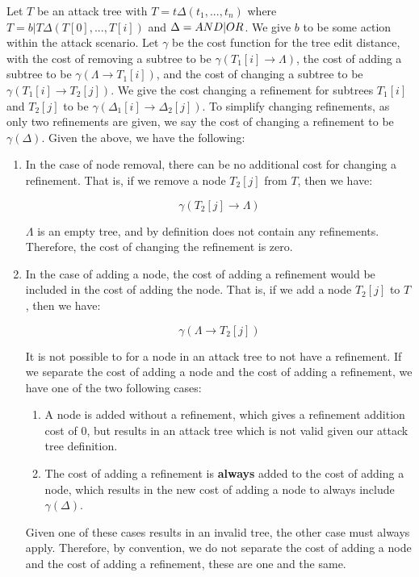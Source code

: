 \begin{definition} \label{def:attack-tree} Let $T$ be an attack tree with $T = t\Delta(t_1,...,t_n)$ where $T = b|T\Delta(T[0],...,T[i])$ and $\Delta = AND|OR$. We give $b$ to be some action within the attack scenario. Let $\gamma$ be the cost function for the tree edit distance, with the cost of removing a subtree to be $\gamma(T_1[i] \rightarrow {\Lambda})$, the cost of adding a subtree to be $\gamma({\Lambda}\rightarrow T_1[i])$, and the cost of changing a subtree to be $\gamma(T_1[i] \rightarrow T_2[j])$. We give the cost changing a refinement for subtrees $T_1[i]$ and $T_2[j]$ to be $\gamma(\Delta_1[i] \rightarrow \Delta_2[j])$. To simplify changing refinements, as only two refinements are given, we say the cost of changing a refinement to be $\gamma(\Delta)$.  Given the above, we have the following:

\begin{enumerate} 
\item In the case of node removal, there can be no additional cost for changing a refinement. That is, if we remove a node $T_2[j]$ from $T$, then we have:

$$\gamma(T_2[j] \rightarrow {\Lambda})$$

            $\Lambda$ is an empty tree, and by definition does not contain any refinements. Therefore, the cost of changing the refinement is zero.

\item In the case of adding a node, the cost of adding a refinement would be included in the cost of adding the node. That is, if we add a node $T_2[j]$ to $T$, then we have:

$$\gamma(\Lambda \rightarrow {T_2[j]})$$

It is not possible to for a node in an attack tree to not have a refinement. If we separate the cost of adding a node and the cost of adding a refinement, we have one of the two following cases:
\begin{enumerate}
      \item A node is added without a refinement, which gives a refinement addition cost of 0, but results in an attack tree which is not valid given our attack tree definition.
      \item The cost of adding a refinement is \textbf{always} added to the cost of adding a node, which results in the new cost of adding a node to always include $\gamma(\Delta)$.
\end{enumerate}

Given one of these cases results in an invalid tree, the other case must always apply. Therefore, by convention, we do not separate the cost of adding a node and the cost of adding a refinement, these are one and the same.


\end{enumerate}
\end{definition}
